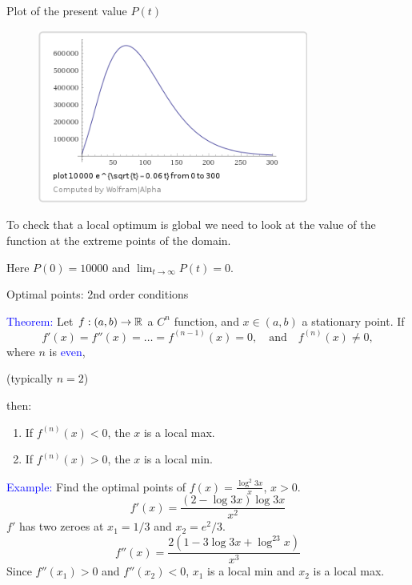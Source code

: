 \documentclass[11pt,aspectratio=169]{beamer}
\begin{document}
\begin{frame}{Plot of the present value $P(t)$}


\begin{figure}
\includegraphics[width=3.5in]{img/plot} 
\end{figure}
To check  that  a  local optimum is global we need to look at the value  of  the  function at the  extreme points of the domain. 

Here $P(0)=10000$ and $\lim_{t \rightarrow \infty} P(t)=0$.
\end{frame}

\begin{frame}{Optimal points: 2nd order conditions}

\textcolor{blue}{Theorem:} Let $f:(a,b) \rightarrow \mathbb R$ a $C^n$ function, and $x \in (a,b)$ a stationary point. If
$$
f'(x)=f''(x)=\dots=f^{(n-1)}(x)=0, \quad \text{and} \quad f^{(n)}(x) \neq 0,
$$
where $n$ is \textcolor{blue}{even}, \begin{tiny} (typically $n=2$)\end{tiny} then:
\begin{enumerate}
\item If $f^{(n)}(x)<0$, the $x$ is a local max.
\item If $f^{(n)}(x)>0$, the $x$ is a local min.
\end{enumerate}

\textcolor{blue}{Example:} Find the optimal points of $f(x)=\frac{\log^2 3x}{x}$, $x>0$.
$$
f'(x)=\frac{(2-\log 3x)\log 3x}{x^2}
$$
$f'$ has two zeroes at $x_1=1/3$ and $x_2=e^2/3$.
$$
f''(x)=\frac{2(1-3\log3x+\log^23x)}{x^3}
$$
Since $f''(x_1)>0$ and $f''(x_2)<0$, $x_1$ is a local min and $x_2$ is a local max.
\end{frame}
\end{document}
